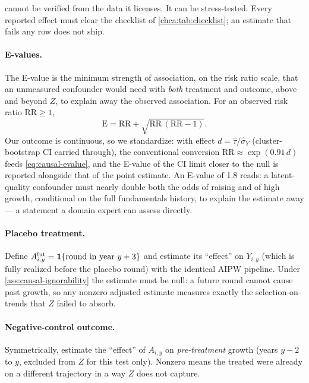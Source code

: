  cannot be verified from the data it licenses. It can be
stress-tested. Every reported effect must clear the checklist of \cref{chca:tab:checklist}; an
estimate that fails any row does not ship.

\paragraph{E-values.} The E-value \citep{vanderweele2017} is the minimum strength of
association, on the risk ratio scale, that an unmeasured confounder would need with \emph{both}
treatment and outcome, above and beyond $Z$, to explain away the observed association. For an
observed risk ratio $\mathrm{RR} \ge 1$,
\begin{equation}\label{eq:causal-evalue}
\mathrm{E} = \mathrm{RR} + \sqrt{\mathrm{RR}\,(\mathrm{RR} - 1)} .
\end{equation}
Our outcome is continuous, so we standardize: with effect $d = \hat\tau / \hat\sigma_Y$
(cluster-bootstrap CI carried through), the conventional conversion $\mathrm{RR} \approx
\exp(0.91\, d)$ feeds \cref{eq:causal-evalue}, and the E-value of the CI limit closer to the
null is reported alongside that of the point estimate. An E-value of 1.8 reads: a latent-quality
confounder must nearly double both the odds of raising and of high growth, conditional on the
full fundamentals history, to explain the estimate away --- a statement a domain expert can
assess directly.

\paragraph{Placebo treatment.} Define $A^{\mathrm{fut}}_{i,y} = \mathbf{1}\{\text{round in year } y +
3\}$ and estimate its ``effect'' on $Y_{i,y}$ (which is fully realized before the placebo round)
with the identical AIPW pipeline. Under \cref{ass:causal-ignorability} the estimate must be
null: a future round cannot cause past growth, so any nonzero adjusted estimate measures exactly
the selection-on-trends that $Z$ failed to absorb.

\paragraph{Negative-control outcome.} Symmetrically, estimate the ``effect'' of $A_{i,y}$ on
\emph{pre-treatment} growth (years $y-2$ to $y$, excluded from $Z$ for this test only). Nonzero
means the treated were already on a different trajectory in a way $Z$ does not capture.

